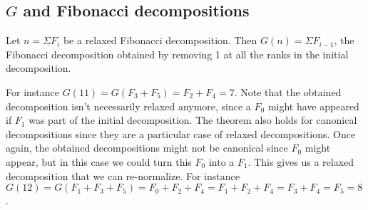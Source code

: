 \documentclass[a4paper,11pt]{article}
\begin{document}
\subsection{$G$ and Fibonacci decompositions}

\begin{theorem}\label{Gshift}
Let $n = \Sigma F_i$ be a relaxed Fibonacci decomposition.
Then $G(n) = \Sigma F_{i-1}$, the Fibonacci decomposition obtained
by removing 1 at all the ranks in the initial decomposition.
\end{theorem}

For instance $G(11) = G(F_3+F_5) = F_2 + F_4 = 7$. Note that the
obtained decomposition isn't necessarily relaxed anymore, since a
$F_0$ might have appeared if $F_1$ was part of the initial
decomposition. The theorem also holds for canonical decompositions
since they are a particular case of relaxed decompositions. Once again,
the obtained decompositions might not be canonical since $F_0$ might
appear, but in this case we could turn this $F_0$ into a $F_1$. This
gives us a relaxed decomposition that we can re-normalize. For
instance $G(12) = G(F_1+F_3+F_5) = F_0+F_2+F_4 = F_1+F_2+F_4 = F_3+F_4
= F_5 = 8$.
 
\end{document}
